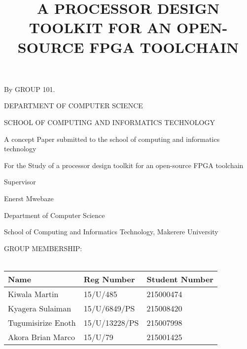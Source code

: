 \documentclass{article}
\title{A PROCESSOR DESIGN TOOLKIT FOR AN OPEN-SOURCE FPGA TOOLCHAIN}
\begin{document}
\begin{titlepage}
\maketitle
\begin{center}
By
\vspace{5mm}
GROUP 101.

DEPARTMENT OF COMPUTER SCIENCE

SCHOOL OF COMPUTING AND INFORMATICS TECHNOLOGY
\vspace{20mm}

A concept Paper submitted to the school of computing and informatics technology

For the Study of a processor design toolkit for an open-source FPGA toolchain


\vspace{10mm}
Supervisor

Enerst Mwebaze

Department of Computer Science

School of Computing and Informatics Technology, Makerere University
\end{center}
GROUP MEMBERSHIP:
\\
\\
\begin{tabu} to 1.2\textwidth { | X[1]  | X[c] | X[r] | }
\hline
Name & Reg Number & Student Number \\
\hline
Kiwala Martin &15/U/485 & 215000474 \\
\hline
Kyagera Sulaiman&15/U/6849/PS&215008420\\
\hline
Tugumisirize Enoth&15/U/13228/PS&215007998\\
\hline
Akora Brian Marco&15/U/79&215001425\\
\hline
\end{tabu}
\end{titlepage}
\newpage
\end{document}
